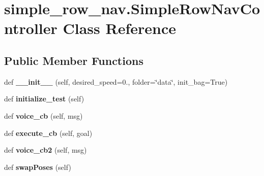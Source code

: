 \hypertarget{classsimple__row__nav_1_1SimpleRowNavController}{}\section{simple\+\_\+row\+\_\+nav.\+Simple\+Row\+Nav\+Controller Class Reference}
\label{classsimple__row__nav_1_1SimpleRowNavController}
\subsection*{Public Member Functions}
\begin{DoxyCompactItemize}
\item 
\mbox{\label{classsimple__row__nav_1_1SimpleRowNavController_af7e9d8917110b51d4e02a8227ff47a91}} 
def {\bfseries \+\_\+\+\_\+init\+\_\+\+\_\+} (self, desired\+\_\+speed=0., folder=\char`\"{}data\char`\"{}, init\+\_\+bag=True)
\item 
\mbox{\label{classsimple__row__nav_1_1SimpleRowNavController_a764796ab31c82680c17b41351dd041c5}} 
def {\bfseries initialize\+\_\+test} (self)
\item 
\mbox{\label{classsimple__row__nav_1_1SimpleRowNavController_a1217a7f9df00251c6b6ea226e29d71fe}} 
def {\bfseries voice\+\_\+cb} (self, msg)
\item 
\mbox{\label{classsimple__row__nav_1_1SimpleRowNavController_a7f011691d37ba14f39d338583bd7110b}} 
def {\bfseries execute\+\_\+cb} (self, goal)
\item 
\mbox{\label{classsimple__row__nav_1_1SimpleRowNavController_a97ca81b160bbee9e44c328ec3c89e5fe}} 
def {\bfseries voice\+\_\+cb2} (self, msg)
\item 
\mbox{\label{classsimple__row__nav_1_1SimpleRowNavController_a56192e6ab8e7f13b3595e88c1fe3ddf9}} 
def {\bfseries swap\+Poses} (self)
\item 
\mbox{\label{classsimple__row__nav_1_1SimpleRowNavController_a8dcbbf5c8dd3982882eb3c2e9fbac828}} 

\end{DoxyCompactItemize}
